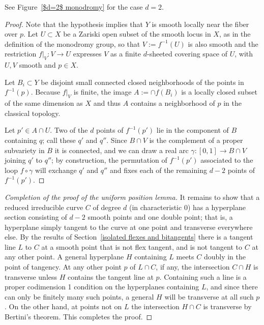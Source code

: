 See Figure~\ref{$d=2$ monodromy} for the case $d=2$.

\begin{proof} Note that the hypothesis implies that $Y$ is smooth
locally near the fiber over $p$. Let $U \subset X$ be a Zariski open subset of the smooth locus in $X$, as in the definition of the monodromy group, so that  $V := f^{-1}(U)$ is also smooth and the restriction $f|_V : V \to U$ expresses $V$ as a finite $d$-sheeted covering space of $U$, with $U,V$ smooth and $p\in X$.

Let $B_i\subset Y$ be disjoint small connected closed neighborhoods of the points
in $f^{-1}(p)$. Because $f|_V$  is finite, the image $A := \cap f(B_i)$  is a locally
closed subset of the same dimension as $X$ and thus $A$
 contains a neighborhood
of $p$ in the classical topology.

Let $p' \in A \cap U$. Two of the $d$ points of $f^{-1}(p')$  lie in the component  of $B$ containing $q$; call these $q'$ and $q''$. Since $B \cap V$ is the complement of a proper subvariety in $B$ it is connected, and we can draw a real arc $\gamma : [0,1] \to B \cap V$ joining $q'$ to $q''$; by construction, the permutation of $f^{-1}(p')$ associated to the loop $f \circ \gamma$ will exchange $q'$ and $q''$ and fixes each of the remaining $d-2$ points of $f^{-1}(p')$.
\end{proof}

\begin{proof}[Completion of the proof of the uniform position lemma]
 It remains to show that a reduced irreducible curve $C$ of degree $d$ (in characteristic 0)
 has a hyperplane section consisting of $d-2$ smooth points and one double point; that is, a hyperplane simply tangent to the curve at one point and transverse everywhere else. By the results of 
 Section~\ref{isolated flexes and bitangents} there is a tangent line $L$ to $C$ at a smooth point that is not flex tangent, and is not tangent to $C$ at any other point. A general hyperplane $H$ containing $L$ meets $C$ doubly in the point of
 tangency. At any other point $p$ of $L\cap C$, if any, the intersection $C\cap H$ is transverse
 unless $H$ contains the tangent line at $p$. Containing such a line is a  proper codimension 1 condition on
 the hyperplanes containing $L$, and since there can only be finitely many such points, a
 general  $H$ will be transverse at all such $p$. On the other hand, at points not on $L$
 the intersection $H\cap C$ is transverse by Bertini's theorem. This completes the proof.
\end{proof}

